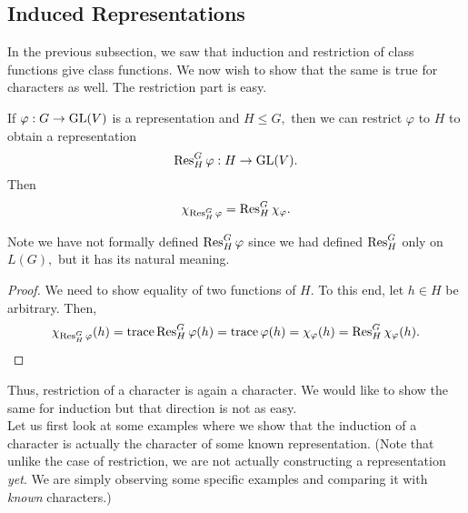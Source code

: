 \subsection{Induced Representations}

In the previous subsection, we saw that induction and restriction of class functions give class functions. We now wish to show that the same is true for characters as well. The restriction part is easy.

\begin{prop}
	If $\varphi : G \to \operatorname{GL}(V)$ is a representation and $H \le G,$ then we can restrict $\varphi$ to $H$ to obtain a representation
	\begin{equation*} 
		\operatorname{Res}^{G}_{H}\varphi : H \to \operatorname{GL}(V).
	\end{equation*}
	Then
	\begin{equation*} 
		\chi_{\operatorname{Res}^{G}_{H}\varphi} = \operatorname{Res}^{G}_{H}\chi_\varphi.
	\end{equation*}
\end{prop}
Note we have not formally defined $\operatorname{Res}^{G}_{H}\varphi$ since we had defined $\operatorname{Res}^{G}_{H}$ only on $L(G),$ but it has its natural meaning.

\begin{proof} 
	We need to show equality of two functions of $H.$ To this end, let $h \in H$ be arbitrary. Then,
	\begin{equation*} 
		\chi_{\operatorname{Res}^{G}_{H}\varphi}(h) = \operatorname{trace} \operatorname{Res}^{G}_{H}\varphi(h) = \operatorname{trace} \varphi(h) = \chi_\varphi(h) = \operatorname{Res}^{G}_{H}\chi_\varphi(h). \qedhere
	\end{equation*}
\end{proof}

Thus, restriction of a character is again a character. We would like to show the same for induction but that direction is not as easy. \\
Let us first look at some examples where we show that the induction of a character is actually the character of some known representation. (Note that unlike the case of restriction, we are not actually constructing a representation \emph{yet}. We are simply observing some specific examples and comparing it with \emph{known} characters.)

